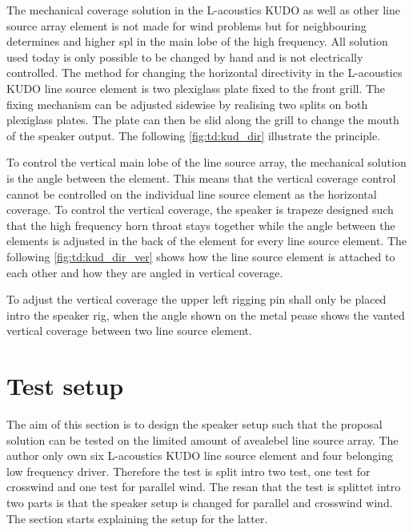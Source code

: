 


The mechanical coverage solution in the L-acoustics KUDO as well as other line source array element is not made for wind problems but for neighbouring determines and higher \gls{spl} in the main lobe of the high frequency. All solution used today is only possible to be changed by hand and is not electrically controlled. The method for changing the horizontal directivity in the L-acoustics KUDO line source element is two plexiglass plate fixed to the front grill. The fixing mechanism can be adjusted sidewise by realising two splits on both plexiglass plates. The plate can then be slid along the grill to change the mouth of the speaker output. The following \autoref{fig:td:kud_dir} illustrate the principle.


To control the vertical main lobe of the line source array, the mechanical solution is the angle between the element. This means that the vertical coverage control cannot be controlled on the individual line source element as the horizontal coverage. To control the vertical coverage, the speaker is trapeze designed such that the high frequency horn throat stays together while the angle between the elements is adjusted in the back of the element for every line source element. The following \autoref{fig:td:kud_dir_ver} shows how the line source element is attached to each other and how they are angled in vertical coverage.


To adjust the vertical coverage the upper left rigging pin shall only be placed intro the speaker rig, when the angle shown on the metal pease shows the vanted vertical coverage between two line source element.  

\section{Test setup}\label{sec:pro:test_setup}
The aim of this section is to design the speaker setup such that the proposal solution can be tested on the limited amount of avealebel line source array. The author only own six L-acoustics KUDO line source element and four belonging low frequency driver. Therefore the test is split intro two test, one test for crosswind and one test for parallel wind. The resan that the test is splittet intro two parts is that the speaker setup is changed for parallel and crosswind wind. The section starts explaining the setup for the latter.

